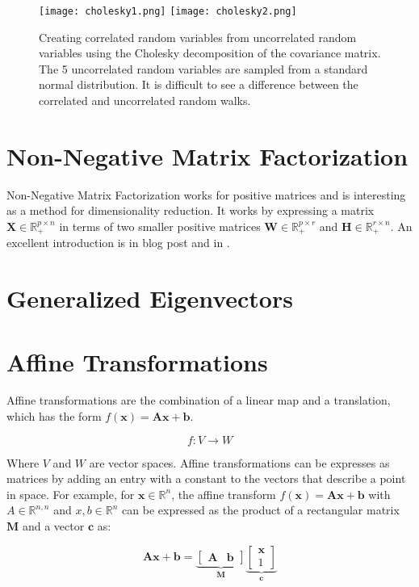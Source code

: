 \begin{figure}
\centering
\texttt{[image: cholesky1.png]}
\texttt{[image: cholesky2.png]}
\caption{Creating correlated random variables from uncorrelated random variables using the Cholesky decomposition of the covariance matrix. The 5 uncorrelated random variables are sampled from a standard normal distribution. It is difficult to see a difference between the correlated and uncorrelated random walks.}
\end{figure}

\section{Non-Negative Matrix Factorization}
Non-Negative Matrix Factorization works for positive matrices and is interesting as a method for dimensionality reduction. It works by expressing a matrix $\mathbf{X}\in\mathbb{R}^{p\times n}_+$ in terms of two smaller positive matrices $\mathbf{W}\in\mathbb{R}_+^{p\times r}$ and $\mathbf{H}\in \mathbb{R}^{r\times n}_+$. An excellent introduction is in  blog post and in . 


\section{Generalized Eigenvectors}


\section{Affine Transformations}

Affine transformations are the combination of a linear map and a translation, which has the form $f(\mathbf{x}) = \mathbf{A}\mathbf{x} + \mathbf{b}$. 

\begin{equation}
f: V \rightarrow W
\end{equation}

Where $V$ and $W$ are vector spaces. Affine transformations can be expresses as matrices by adding an entry with a constant to the vectors that describe a point in space. For example, for $\mathbf{x} \in \mathbb{R}^n$,  the affine transform $f(\mathbf{x}) = \mathbf{A}\mathbf{x} + \mathbf{b}$ with $A\in\mathbb{R}^{n,n}$ and $x,b \in \mathbb{R}^{n}$ can be expressed as the product of a rectangular matrix $\mathbf{M}$ and a vector $\mathbf{c}$ as:

\begin{equation}
\mathbf{A}\mathbf{x} + \mathbf{b} = \underbrace{\left[\begin{array}{c|c} \mathbf{A} & \mathbf{b} \end{array}\right]}_{\mathbf{M}} \underbrace{\left[\begin{array}{c} \mathbf{x} \\ 1\end{array} \right]}_{\mathbf{c}}
\end{equation}

